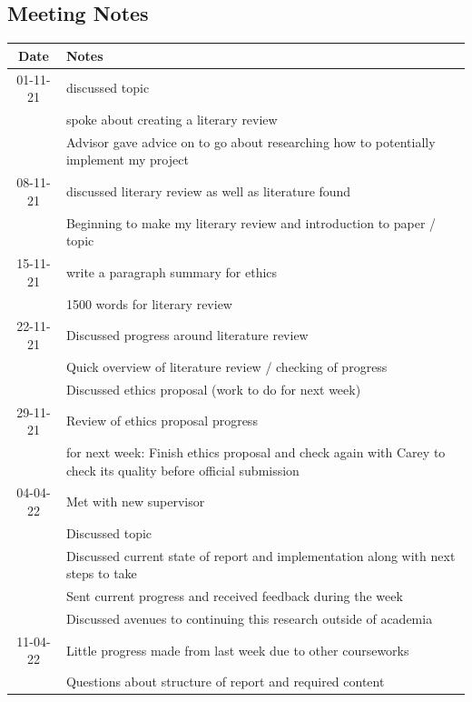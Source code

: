 \documentclass[a4paper]{article}
\begin{document}
\subsection{Meeting Notes}\label{appendix:meeting-notes}
\begin{table}[H]

\hspace*{-6em}
    \begin{tabular}{|| c | m{14cm} ||}
		\hline
		Date & Notes \\ [0.5ex]
		\hline\hline
		01-11-21    & discussed topic\\
                    & spoke about creating a literary review\\
                    &  Advisor gave advice on to go about researching how to potentially implement my project    \\
        \hline
		08-11-21    & discussed literary review as well as literature found \\
                    & Beginning to make my literary review and introduction to paper / topic    \\

        \hline
		15-11-21    & write a paragraph summary for ethics \\
                    & 1500 words for literary review \\

        \hline
		22-11-21    & Discussed progress around literature review \\
                    & Quick overview of literature review / checking of progress \\
                    & Discussed ethics proposal (work to do for next week) \\

        \hline
		29-11-21    & Review of ethics proposal progress \\
                    & for next week: Finish ethics proposal and check again with Carey to check its quality before official submission \\
        \hline
		04-04-22    & Met with new supervisor \\
                    & Discussed topic \\
                    & Discussed current state of report and implementation along with next steps to take \\
                    & Sent current progress and received feedback during the week \\
                    & Discussed avenues to continuing this research outside of academia \\
		\hline
        11-04-22 & Little progress made from last week due to other courseworks \\
                 & Questions about structure of report and required content \\


\end{tabular}
\end{table}
\end{document}
